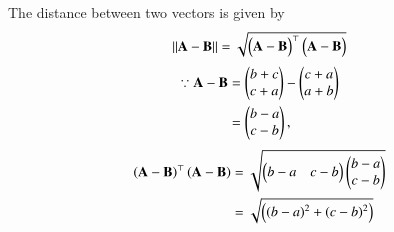 The distance between two vectors is given by 
\begin{align}
\label{1/5/eq:eq5}
\norm{\vec{A}-\vec{B}}&= \sqrt{\myvec{\vec{A}-\vec{B}}^\top\myvec{\vec{A}-\vec{B}}}\\
\end{align}
\begin{align}
	\because \mathbf{A}-\mathbf{B}&=\begin{pmatrix}b+c\\c+a\end{pmatrix} -\begin{pmatrix}c+a\\a+b\end{pmatrix}\\
&=\begin{pmatrix}b-a\\c-b\end{pmatrix},
\end{align}
\begin{align}\left(\mathbf{A}-\mathbf{B}\right)^{\top}\left(\mathbf{A}-\mathbf{B}\right)
	&=\sqrt{\begin{pmatrix}b-a & c-b\end{pmatrix}\begin{pmatrix}b-a\\c-b\end{pmatrix}} \\
	&=\sqrt{\begin{pmatrix}(b-a)^2+(c-b)^2\end{pmatrix}} 
\end{align}
